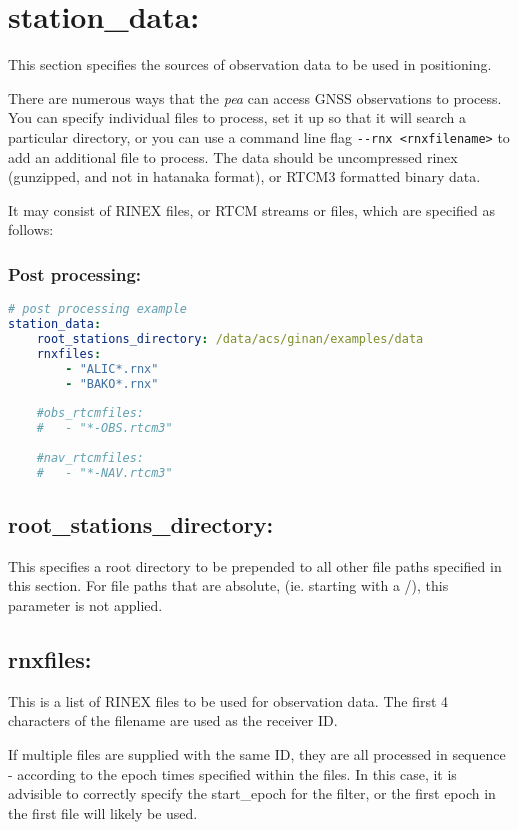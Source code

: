 \section{station\_data:}
This section specifies the sources of observation data to be used in positioning.


There are numerous ways that the \emph{pea} can access GNSS observations to process. 
You can specify individual files to process, set it up so that it will search a particular directory, or you can use a command line flag \lstinline{--rnx <rnxfilename>} to add an additional file to process. 
The data should be uncompressed rinex (gunzipped, and not in hatanaka format), or RTCM3 formatted binary data.


It may consist of RINEX files, or RTCM streams or files, which are specified as follows:
\subsubsection{Post processing:}

\begin{lstlisting}[language=yaml,caption=station\_data:]
# post processing example
station_data:
	root_stations_directory: /data/acs/ginan/examples/data
	rnxfiles:
		- "ALIC*.rnx"
		- "BAKO*.rnx"
		
	#obs_rtcmfiles:
	#	- "*-OBS.rtcm3"
		
	#nav_rtcmfiles:
	#	- "*-NAV.rtcm3"
\end{lstlisting}


\subsection*{root\_stations\_directory:}
This specifies a root directory to be prepended to all other file paths specified in this section. For file paths that are absolute, (ie. starting with a /), this parameter is not applied.

\subsection*{rnxfiles:}
This is a list of RINEX files to be used for observation data. The first 4 characters of the filename are used as the receiver ID.

If multiple files are supplied with the same ID, they are all processed in sequence - according to the epoch times specified within the files. In this case, it is advisible to correctly specify the start\_epoch for the filter, or the first epoch in the first file will likely be used.


